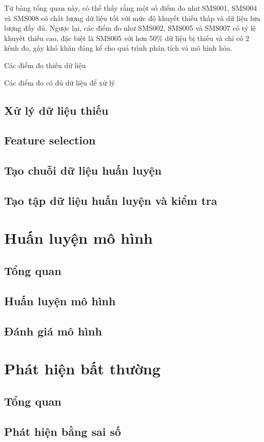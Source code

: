 Từ bảng tổng quan này, có thể thấy rằng một số điểm đo như SMS001, SMS004 và SMS008 có chất lượng dữ liệu tốt với mức độ khuyết thiếu thấp và dữ liệu lưu lượng đầy đủ. Ngược lại, các điểm đo như SMS002, SMS005 và SMS007 có tỷ lệ khuyết thiếu cao, đặc biệt là SMS005 với hơn 50\% dữ liệu bị thiếu và chỉ có 2 kênh đo, gây khó khăn đáng kể cho quá trình phân tích và mô hình hóa.

Các điểm đo thiếu dữ liệu

Các điểm đo có đủ dữ liệu để xử lý


\subsection{Xử lý dữ liệu thiếu}
\subsection{Feature selection}
\subsection{Tạo chuỗi dữ liệu huấn luyện}
\subsection{Tạo tập dữ liệu huấn luyện và kiểm tra}

\section{Huấn luyện mô hình}
\subsection{Tổng quan}
\subsection{Huấn luyện mô hình}
\subsection{Đánh giá mô hình}

\section{Phát hiện bất thường}
\subsection{Tổng quan}
\subsection{Phát hiện bằng sai số}
